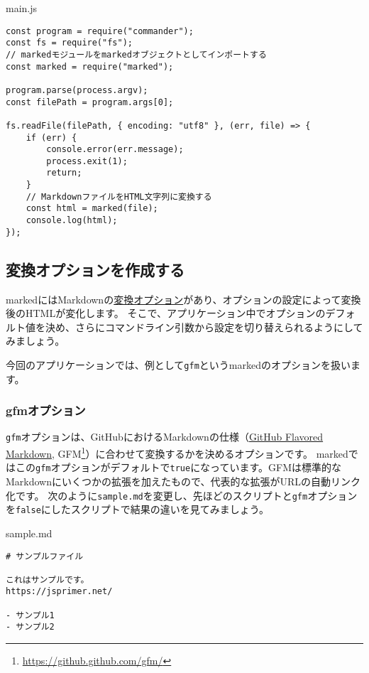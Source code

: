 \begin{listtitle}
main.js
\end{listtitle}
\begin{lstlisting}
const program = require("commander");
const fs = require("fs");
// markedモジュールをmarkedオブジェクトとしてインポートする
const marked = require("marked");

program.parse(process.argv);
const filePath = program.args[0];

fs.readFile(filePath, { encoding: "utf8" }, (err, file) => {
    if (err) {
        console.error(err.message);
        process.exit(1);
        return;
    }
    // MarkdownファイルをHTML文字列に変換する
    const html = marked(file);
    console.log(html);
});
\end{lstlisting}
\listend

\hypertarget{create-convert-option}{%
\subsection{変換オプションを作成する}\label{create-convert-option}}

markedにはMarkdownの\href{https://marked.js.org/\#/USING_ADVANCED.md\#options}{変換オプション}があり、オプションの設定によって変換後のHTMLが変化します。
そこで、アプリケーション中でオプションのデフォルト値を決め、さらにコマンドライン引数から設定を切り替えられるようにしてみましょう。

今回のアプリケーションでは、例として\texttt{gfm}というmarkedのオプションを扱います。

\hypertarget{gfm-option}{%
\subsubsection{gfmオプション}\label{gfm-option}}

\texttt{gfm}オプションは、GitHubにおけるMarkdownの仕様（\href{https://github.github.com/gfm/}{GitHub
Flavored Markdown}, GFM\footnote{\url{https://github.github.com/gfm/}}）に合わせて変換するかを決めるオプションです。
markedではこの\texttt{gfm}オプションがデフォルトで\texttt{true}になっています。GFMは標準的なMarkdownにいくつかの拡張を加えたもので、代表的な拡張がURLの自動リンク化です。
次のように\texttt{sample.md}を変更し、先ほどのスクリプトと\texttt{gfm}オプションを\texttt{false}にしたスクリプトで結果の違いを見てみましょう。

\begin{listtitle}
sample.md
\end{listtitle}
\begin{lstlisting}
# サンプルファイル

これはサンプルです。
https://jsprimer.net/

- サンプル1
- サンプル2
\end{lstlisting}
\listend

